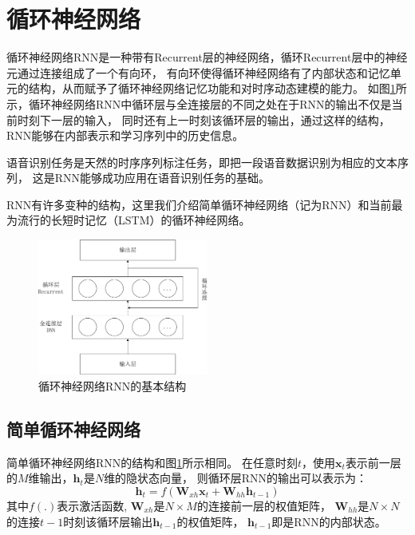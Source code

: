 \section{循环神经网络}

循环神经网络RNN是一种带有Recurrent层的神经网络，循环Recurrent层中的神经元通过连接组成了一个有向环，
有向环使得循环神经网络有了内部状态和记忆单元的结构，从而赋予了循环神经网络记忆功能和对时序动态建模的能力。
如图\ref{fig:rnn}所示，循环神经网络RNN中循环层与全连接层的不同之处在于RNN的输出不仅是当前时刻下一层的输入，
同时还有上一时刻该循环层的输出，通过这样的结构，RNN能够在内部表示和学习序列中的历史信息。

语音识别任务是天然的时序序列标注任务，即把一段语音数据识别为相应的文本序列，
这是RNN能够成功应用在语音识别任务的基础。

RNN有许多变种的结构，这里我们介绍简单循环神经网络（记为RNN）和当前最为流行的长短时记忆（LSTM）的循环神经网络。


\begin{figure}[htbp]
\centering
\includegraphics[width=0.5\textwidth]{figures/chapter3/rnn-crop}
\caption{循环神经网络RNN的基本结构}
\label{fig:rnn}
\end{figure}

\subsection{简单循环神经网络}

简单循环神经网络RNN的结构和图\ref{fig:rnn}所示相同。
在任意时刻$t$，使用$\textbf{x}_t$表示前一层的$M$维输出，$\textbf{h}_t$是$N$维的隐状态向量，
则循环层RNN的输出可以表示为：
\begin{equation}
\textbf{h}_t = f({\textbf{W}_{xh}}{\textbf{x}_t} + {\textbf{W}_{hh}}{\textbf{h}_{t-1}})
\end{equation}
其中$f(.)$表示激活函数, $\textbf{W}_{xh}$是$N \times M$的连接前一层的权值矩阵，
$\textbf{W}_{hh}$是$N \times N$的连接$t-1$时刻该循环层输出$\textbf{h}_{t-1}$的权值矩阵，
$\textbf{h}_{t-1}$即是RNN的内部状态。

